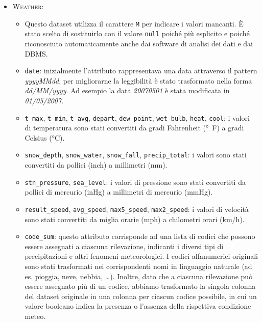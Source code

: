 \begin{itemize}

    \item \textsc{Weather}: 
        
        \begin{itemize}
            \item Questo dataset utilizza il carattere \texttt{M} per indicare 
            i valori mancanti. È stato scelto di sostituirlo con il valore 
            \texttt{null} poiché più esplicito e poiché riconosciuto 
            automaticamente anche dai software di analisi dei dati e dai DBMS.
            
            \item \texttt{date}: inizialmente l'attributo rappresentava una 
                data attraverso il pattern \textit{yyyyMMdd}, per migliorarne 
                la leggibilità è stato trasformato nella forma 
                \textit{dd/MM/yyyy}. Ad esempio la data \textit{20070501} è 
                stata modificata in \textit{01/05/2007}.
        
            \item \texttt{t\_max}, \texttt{t\_min},  \texttt{t\_avg}, 
            \texttt{depart}, \texttt{dew\_point}, \texttt{wet\_bulb}, 
            \texttt{heat}, \texttt{cool}: i valori di temperatura sono stati 
            convertiti da gradi Fahrenheit (\si{\degree F}) a gradi Celsius 
            (\si{\celsius}).

           	\item \texttt{snow\_depth}, \texttt{snow\_water}, 
           	\texttt{snow\_fall}, \texttt{precip\_total}: i valori sono stati 
           	convertiti da pollici (inch) a millimetri (mm).

            \item \texttt{stn\_pressure}, \texttt{sea\_level}: i valori di 
            pressione sono stati convertiti da pollici di mercurio (inHg) a 
            millimetri di mercurio (mmHg).

            \item \texttt{result\_speed}, \texttt{avg\_speed}, 
            \texttt{max5\_speed}, \texttt{max2\_speed}: i valori di velocità 
            sono stati convertiti da miglia orarie (mph) a chilometri orari 
            (\si[per-mode=symbol]{\km\per\hour}).
            
            \item \texttt{code\_sum}: questo attributo corrisponde ad una lista 
            di codici che possono essere assegnati a ciascuna rilevazione, 
            indicanti i diversi tipi di precipitazioni e altri fenomeni
            meteorologici. I codici alfanumerici originali sono stati 
            trasformati nei corrispondenti nomi in linguaggio naturale (ad es. 
            pioggia, neve, nebbia, \dots). Inoltre, dato che a ciascuna 
            rilevazione può essere assegnato più di un codice, abbiamo 
            trasformato la singola colonna del dataset originale in una colonna 
            per ciascun codice possibile, in cui un valore booleano indica la 
            presenza o l'assenza della rispettiva condizione meteo.
        \end{itemize}
	

\end{itemize}

